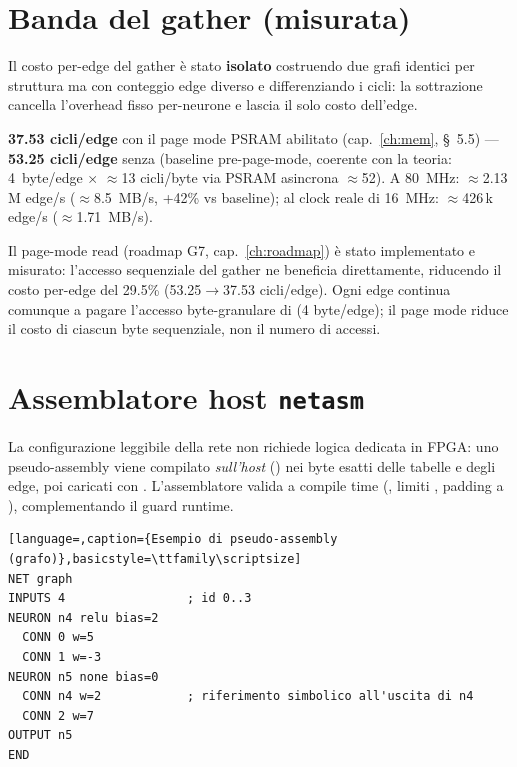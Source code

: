 \section{Banda del gather (misurata)}
Il costo per-edge del gather è stato \textbf{isolato} costruendo due grafi identici per
struttura ma con conteggio edge diverso e differenziando i cicli: la sottrazione cancella
l'overhead fisso per-neurone e lascia il solo costo dell'edge.

\begin{fnspec}
\textbf{37.53 cicli/edge} con il page mode PSRAM abilitato (cap.~\ref{ch:mem},
\S~5.5) --- \textbf{53.25 cicli/edge} senza (baseline pre-page-mode, coerente con la
teoria: 4~byte/edge $\times$ $\approx$13 cicli/byte via PSRAM asincrona
$\approx$52). A 80~MHz: $\approx$2.13\,M edge/s ($\approx$8.5~MB/s, +42\% vs
baseline); al clock reale di 16~MHz: $\approx$426\,k edge/s ($\approx$1.71~MB/s).
\end{fnspec}

Il page-mode read (roadmap G7, cap.~\ref{ch:roadmap}) è stato implementato e misurato:
l'accesso sequenziale del gather ne beneficia direttamente, riducendo il costo per-edge
del 29.5\% (53.25$\to$37.53 cicli/edge). Ogni edge continua comunque a pagare l'accesso
byte-granulare di  (4 byte/edge); il page mode riduce il costo
di ciascun byte sequenziale, non il numero di accessi.

\section{Assemblatore host \texttt{netasm}}
La configurazione leggibile della rete non richiede logica dedicata in FPGA: uno
pseudo-assembly viene compilato \emph{sull'host} () nei byte esatti
delle tabelle e degli edge, poi caricati con . L'assemblatore valida a
compile time (, limiti , padding a ),
complementando il guard runtime.

\begin{lstlisting}[language=,caption={Esempio di pseudo-assembly (grafo)},basicstyle=\ttfamily\scriptsize]
NET graph
INPUTS 4                 ; id 0..3
NEURON n4 relu bias=2
  CONN 0 w=5
  CONN 1 w=-3
NEURON n5 none bias=0
  CONN n4 w=2            ; riferimento simbolico all'uscita di n4
  CONN 2 w=7
OUTPUT n5
END
\end{lstlisting}
